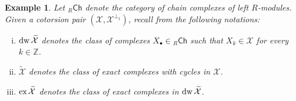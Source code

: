 \documentclass[10pt,reqno]{amsart}
\numberwithin{equation}{section}
\newtheorem{example}[definition]{Example}
\theoremstyle{remark}
\newcommand{\X}{\mathcal{X}}
\begin{document}
\begin{example}\label{ex:pairs_in_Ch}
Let ${}_R\mathsf{Ch}$ denote the category of chain complexes of left $R$-modules. Given a cotorsion pair $(\mathcal{X},\mathcal{X}^{\perp_1})$, recall from \cite{GillespieFlat} the following notations: 
\begin{enumerate}[(i)]
\item ${\rm dw}\,\widetilde{\X}$ denotes the class of complexes $X_\bullet \in {}_R\mathsf{Ch}$ such that $X_k \in \X$ for every $k \in \mathbb{Z}$.

\item $\widetilde{\mathcal{X}}$ denotes the class of exact complexes with cycles in $\mathcal{X}$. 

\item ${\rm ex}\,\widetilde{\X}$ denotes the class of exact complexes in ${\rm dw}\,\widetilde{\X}$.


\end{enumerate}
\end{example}
\end{document}
